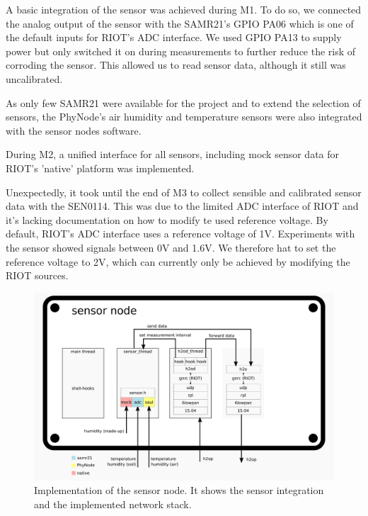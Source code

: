 \documentclass[11pt,paper=a4,parskip=half]{scrartcl}
\begin{document}
  A basic integration of the sensor was achieved during M1. To do so, we
  connected the analog output of the sensor with the SAMR21's GPIO PA06 which
  is one of the default inputs for RIOT's ADC interface. We used GPIO PA13 to
  supply power but only switched it on during measurements to further reduce
  the risk of corroding the sensor. This allowed us to read sensor data,
  although it still was uncalibrated.

  As only few SAMR21 were available for the project and to extend the selection
  of sensors, the PhyNode's air humidity and temperature sensors were also
  integrated with the sensor nodes software.

  During M2, a unified interface for all sensors, including mock sensor data
  for RIOT's 'native' platform was implemented.

  Unexpectedly, it took until the end of M3 to collect sensible and calibrated
  sensor data with the SEN0114. This was due to the limited ADC interface of
  RIOT and it's lacking documentation on how to modify te used reference
  voltage. By default, RIOT's ADC interface uses a reference voltage of 1V.
  Experiments with the sensor showed signals between 0V and 1.6V. We therefore
  hat to set the reference voltage to 2V, which can currently only be achieved
  by modifying the RIOT sources.



  \begin{figure}[h]
    \centering
    \includegraphics[scale=0.16]{stack-sensor}
	  \caption{Implementation of the sensor node. It shows the sensor
	  integration and the implemented network stack.}
    \label{fig:schema}
  \end{figure}
\end{document}
